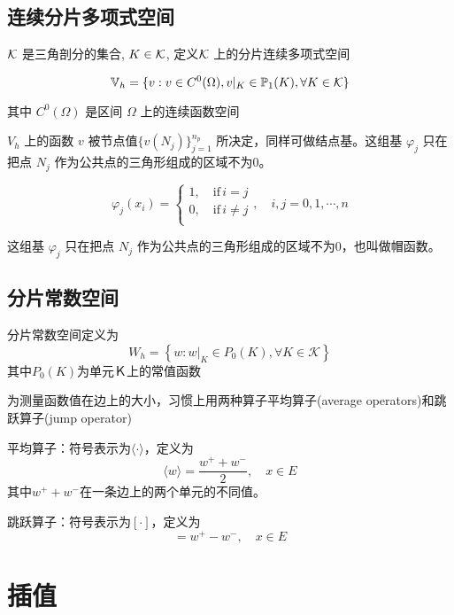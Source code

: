 \documentclass{article}
\begin{document}
\subsection{连续分片多项式空间}

${\mathcal K}$ 是三角剖分的集合, $K \in {\mathcal K}$, 定义${\mathcal K}$ 上的分片连续多项式空间

\begin{equation}
    {\mathbb V}_h = \{v: v\in C^0(\Omega), v|_K \in {\mathbb P}_1(K), \forall K \in {\mathcal K}\}
\end{equation}

其中 $C^0(\Omega)$ 是区间 $\Omega$ 上的连续函数空间

$V_h$ 上的函数 $v$ 被节点值$\{v(N_j)\}_{j=1}^{n_p}$ 所决定，同样可做结点基。这组基 $\varphi_j$ 只在把点 $N_j$ 作为公共点的三角形组成的区域不为0。

\begin{equation}
    \varphi_j(x_i) = \begin{cases}
        1, \quad \text{if} \, i = j \\
        0, \quad \text{if} \, i \ne j \\
    \end{cases},
    \quad i, j = 0, 1, \cdots, n
\end{equation}

这组基 $\varphi_j$ 只在把点 $N_j$ 作为公共点的三角形组成的区域不为0，也叫做帽函数。

\subsection{分片常数空间}
分片常数空间定义为
\begin{equation}
W_{h}=\left\{w:\left.w\right|_{K} \in P_{0}(K), \forall K \in \mathcal{K}\right\}
\end{equation}
其中$P_{0}(K)$为单元Ｋ上的常值函数

为测量函数值在边上的大小，习惯上用两种算子平均算子(average operators)和跳跃算子(jump operator)

平均算子：符号表示为$\langle\cdot\rangle$，定义为
\begin{equation}
\langle w\rangle=\frac{w^{+}+w^{-}}{2}, \quad x \in E
\end{equation}
其中$w^{+}+w^{-}$在一条边上的两个单元的不同值。

跳跃算子：符号表示为$[\cdot]$，定义为
\begin{equation}
[w]=w^{+}-w^{-}, \quad x \in E
\end{equation}


\section{插值}
\end{document}
